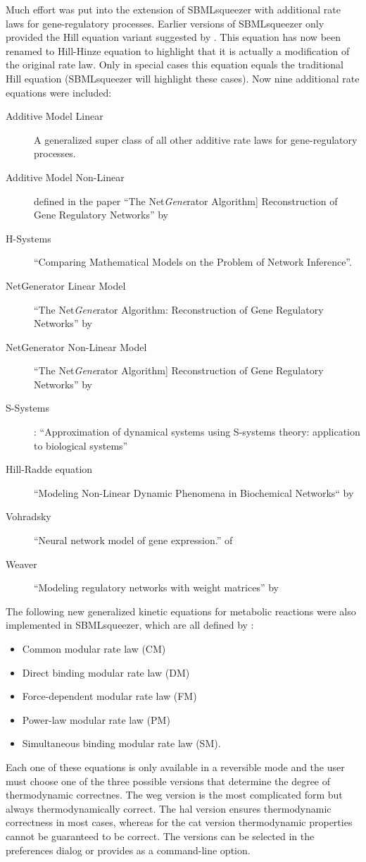 Much effort was put into the extension of SBMLsqueezer with additional rate laws
for gene-regulatory processes. Earlier versions of SBMLsqueezer only provided
the Hill equation variant suggested by \citet{Hinze2007}. This equation has now
been renamed to Hill-Hinze equation to highlight that it is actually a
modification of the original rate law. Only in special cases this equation
equals the traditional Hill equation (SBMLsqueezer will highlight these cases).
Now nine additional rate equations were included:
\begin{description}
\item[Additive Model Linear] A generalized super class of all other additive rate laws for gene-regulatory processes.
\item[Additive Model Non-Linear] defined in the paper ``The Net\emph{Gene}rator Algorithm] Reconstruction of Gene Regulatory Networks'' by \citealp*{Toepfer2007}
\item[H-Systems] \citealp*{Spieth2006} ``Comparing Mathematical Models on the Problem of Network Inference''.
\item[NetGenerator Linear Model] ``The Net\emph{Gene}rator Algorithm: Reconstruction of Gene Regulatory Networks'' by \citealp*{Toepfer2007}
\item[NetGenerator Non-Linear Model] ``The Net\emph{Gene}rator Algorithm] Reconstruction of Gene Regulatory Networks'' by \citealp*{Toepfer2007}
\item[S-Systems] \citet{Tournier2005}: ``Approximation of dynamical systems using S-systems theory: application to biological systems''
\item[Hill-Radde equation] ``Modeling Non-Linear Dynamic Phenomena in Biochemical Networks`` by \citealp*{Radde2007}
\item[Vohradsky] ``Neural network model of gene expression.'' of \citealp{Vu2007}
\item[Weaver] ``Modeling regulatory networks with weight matrices'' by \citealp*{Weaver1999}
\end{description}

The following new generalized kinetic equations for metabolic reactions were
also implemented in SBMLsqueezer, which are all defined by \citet{Liebermeister2010}:
\begin{itemize}
\item Common modular rate law (CM)
\item Direct binding modular rate law (DM)
\item Force-dependent modular rate law (FM)
\item Power-law modular rate law (PM)
\item Simultaneous binding modular rate law (SM).
\end{itemize}
Each one of these equations is only available in a reversible mode and the user
must choose one of the three possible versions that determine the degree of
thermodynamic correctnes. The weg version is the most complicated form but
always thermodynamically correct. The hal version ensures thermodynamic
correctness in most cases, whereas for the cat version thermodynamic properties
cannot be guaranteed to be correct. The versions can be selected in the
preferences dialog or provides as a command-line option.

